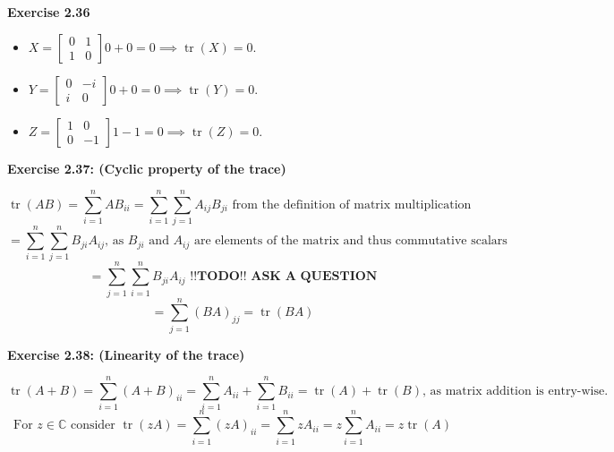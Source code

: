\documentclass{article}
\begin{document}
\begin{framed}
    \noindent \textbf{Exercise 2.36}
    
    \medskip
    
    \begin{itemize}
        \item $X = \begin{bmatrix} 0 & 1 \\ 1 & 0\end{bmatrix} 0 + 0 = 0 \implies \operatorname{tr}(X) = 0  $.
        \item $Y = \begin{bmatrix} 0 & -i \\ i & 0\end{bmatrix} 0 + 0 = 0 \implies \operatorname{tr}(Y) = 0  $.
        \item $Z = \begin{bmatrix} 1 & 0 \\0 & -1\end{bmatrix} 1 - 1 = 0 \implies \operatorname{tr}(Z) = 0 $.
    \end{itemize}
    
\end{framed}

\bigskip

\begin{framed}
    \noindent \textbf{Exercise 2.37: (Cyclic property of the trace)}
    
    \medskip

    $$
    \operatorname{tr}(AB) = \sum_{i=1}^{n}{AB}_{ii} = \sum_{i=1}^{n}\sum_{j=1}^{n}A_{ij}B_{ji} \text{ from the definition of matrix multiplication}
    $$
    $$
    = \sum_{i=1}^{n}\sum_{j=1}^{n}{B_{ji}A_{ij}} \text{, as } B_{ji} \text{ and } A_{ij} \text{ are elements of the matrix and thus commutative scalars}
    $$
    $$
    = \sum_{j=1}^{n}\sum_{i=1}^{n}{B_{ji}A_{ij}} \textbf{ !!TODO!! ASK A QUESTION}
    $$
    $$
    = \sum_{j=1}^{n}(BA)_{jj} = \operatorname{tr}(BA)
    $$
    
    
\end{framed}

\bigskip

\begin{framed}
    \noindent \textbf{Exercise 2.38: (Linearity of the trace)}
    
    \medskip

    $$
    \operatorname{tr}(A + B) = \sum_{i=1}^{n}{(A + B)_{ii}} = \sum_{i=1}^{n}A_{ii} + \sum_{i=1}^{n}B_{ii} = \operatorname{tr}(A) + \operatorname{tr}(B) \text{, as matrix addition is entry-wise}.
    $$
    $$
    \text{For } z \in \mathbb{C} \text{ consider } \operatorname{tr}(zA) = 
    \sum_{i=1}^{n}{(zA)_{ii}} = \sum_{i=1}^{n}{zA_{ii}} = z\sum_{i=1}^{n}{A_{ii}} = z\operatorname{tr}(A)
    $$
    
\end{framed}
\end{document}
